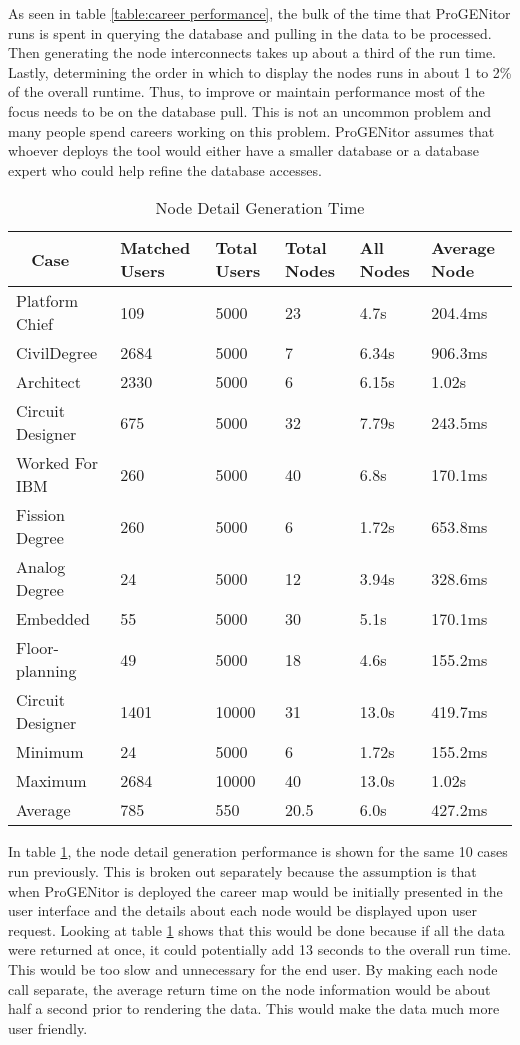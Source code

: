 As seen in table \ref{table:career performance}, the bulk of the time that
ProGENitor runs is spent in querying the database and pulling in the data to be
processed.  Then generating the node interconnects takes up about a third of the
run time. Lastly, determining the order in which to display the nodes runs in
about 1 to 2\% of the overall runtime.  Thus, to improve or maintain performance most of
the focus needs to be on the database pull.  This is not an uncommon problem and
many people spend careers working on this problem.  ProGENitor assumes that
whoever deploys the tool would either have a smaller database or a database
expert who could help refine the database accesses.

\begin{table}[H]
  \centering
  \begin{tabular}{|p{17mm}|p{16mm}|p{10mm}|p{18mm}|p{19mm}|p{20mm}|}
  \hline
  \
  Case&Matched Users&Total Users&Total Nodes&All Nodes&Average Node\\
  \hline\hline
  Platform Chief&109&5000&23&4.7s&204.4ms\\ \hline
  Civil\newline Degree&2684&5000&7&6.34s&906.3ms\\ \hline 
  Architect&2330&5000&6&6.15s&1.02s\\ \hline
  Circuit Designer&675&5000&32&7.79s&243.5ms\\ \hline
  Worked For IBM&260&5000&40&6.8s&170.1ms\\ \hline
  Fission Degree&260&5000&6&1.72s&653.8ms\\ \hline
  Analog Degree&24&5000&12&3.94s&328.6ms\\ \hline
  Embedded&55&5000&30&5.1s&170.1ms\\ \hline
  Floor- \newline planning&49&5000&18&4.6s&155.2ms\\ \hline
  Circuit Designer&1401&10000&31&13.0s&419.7ms\\ \hline
  \hline\hline
  Minimum&24&5000&6&1.72s&155.2ms\\ \hline
  Maximum&2684&10000&40&13.0s&1.02s\\ \hline
  Average&785&550&20.5&6.0s&427.2ms\\ \hline
  \end{tabular}
  \caption{Node Detail Generation Time}
  \label{table:node-perf}
\end{table}

In table \ref{table:node-perf}, the node detail generation performance is shown
for the same 10 cases run previously.  This is broken out separately because the
assumption is that when ProGENitor is deployed the career map would be initially
presented in the user interface and the details about each node would be
displayed upon user request.  Looking at table \ref{table:node-perf} shows that
this would be done because if all the data were returned at once, it could
potentially add 13 seconds to the overall run time.  This would be too slow and
unnecessary for the end user.  By making each node call separate, the average
return time on the node information would be about half a second prior to
rendering the data.  This would make the data much more user friendly.